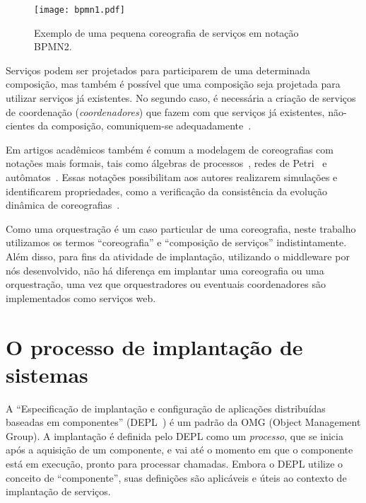 \begin{figure}[!h]
  \centering
  \texttt{[image: bpmn1.pdf]} 
  \caption{Exemplo de uma pequena coreografia de serviços em notação BPMN2.}
  \label{fig:bpmn1} 
\end{figure}

Serviços podem ser projetados para participarem de uma determinada composição, mas também é possível que uma composição seja projetada para utilizar serviços já existentes. No segundo caso, é necessária a criação de serviços de coordenação (\emph{coordenadores}) que fazem com que serviços já existentes, não-cientes da composição, comuniquem-se adequadamente~\cite{Autili2013Synthesis}. 

Em artigos acadêmicos também é comum a modelagem de coreografias com notações mais formais, tais como álgebras de processos~\cite{Roohi2011Realizability}, redes de Petri~\cite{Cicirelli2010Dynamically} e autômatos~\cite{Rinderle2006Evolution}. Essas notações possibilitam aos autores realizarem simulações e identificarem propriedades, como a verificação da consistência da evolução dinâmica de coreografias~\cite{Cicirelli2010Dynamically}. 

Como uma orquestração é um caso particular de uma coreografia, neste trabalho utilizamos os termos ``coreografia'' e ``composição de serviços'' indistintamente. 
Além disso, para fins da atividade de implantação, utilizando o middleware por nós desenvolvido,
não há diferença em implantar uma coreografia ou uma orquestração,
uma vez que orquestradores ou eventuais coordenadores são implementados como serviços web.

\section{O processo de implantação de sistemas}
\label{sec:implantacao}

A ``Especificação de implantação e configuração de aplicações distribuídas baseadas em componentes'' (DEPL~\cite{DEPL2006}) é um padrão da OMG (Object Management Group). 
A implantação é definida pelo DEPL como um \emph{processo}, que se inicia após a aquisição de um componente, e vai até o momento em que o componente está em execução, pronto para processar chamadas. 
Embora o DEPL utilize o conceito de ``componente'', suas definições são aplicáveis e úteis ao contexto de implantação de serviços.

